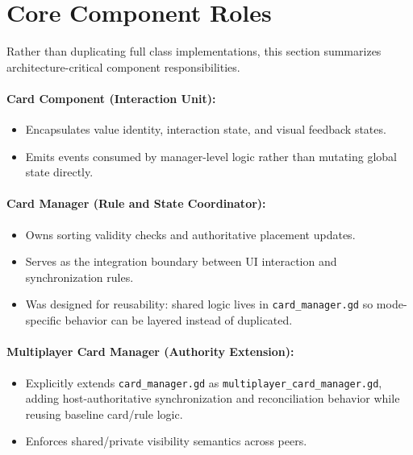 \section{Core Component Roles}
\label{sec:core-components}

Rather than duplicating full class implementations, this section summarizes architecture-critical component responsibilities.

\paragraph*{Card Component (Interaction Unit):}
\label{subsec:card-component}
\begin{itemize}
    \item Encapsulates value identity, interaction state, and visual feedback states.
    \item Emits events consumed by manager-level logic rather than mutating global state directly.
\end{itemize}

\paragraph*{Card Manager (Rule and State Coordinator):}
\label{subsec:card-manager}
\begin{itemize}
    \item Owns sorting validity checks and authoritative placement updates.
    \item Serves as the integration boundary between UI interaction and synchronization rules.
    \item Was designed for reusability: shared logic lives in \texttt{card\_manager.gd} so mode-specific behavior can be layered instead of duplicated.
\end{itemize}

\paragraph*{Multiplayer Card Manager (Authority Extension):}
\label{subsec:multiplayer-card-manager}
\begin{itemize}
    \item Explicitly extends \texttt{card\_manager.gd} as \texttt{multiplayer\_card\_manager.gd}, adding host-authoritative synchronization and reconciliation behavior while reusing baseline card/rule logic.
    \item Enforces shared/private visibility semantics across peers.
\end{itemize}

